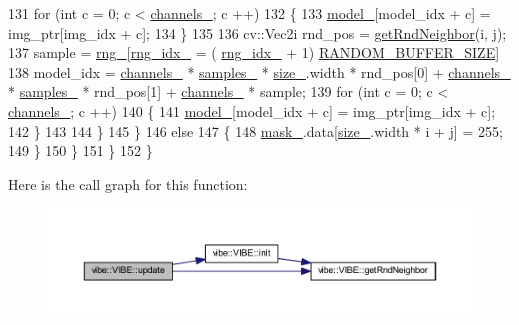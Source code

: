\begin{DoxyCode}
131                     \textcolor{keywordflow}{for} (\textcolor{keywordtype}{int} c = 0; c < \mbox{\hyperlink{classvibe_1_1_v_i_b_e_a141be141bc39ddd6b9dd04df62b5e3b9}{channels\_}}; c ++)
132                     \{
133                         \mbox{\hyperlink{classvibe_1_1_v_i_b_e_af42cd53bbc91e95f14aa6c474bde5601}{model\_}}[model\_idx + c] = img\_ptr[img\_idx + c];
134                     \}
135 
136                     cv::Vec2i rnd\_pos = \mbox{\hyperlink{classvibe_1_1_v_i_b_e_a5ca071697edce3a8459f93cba2386516}{getRndNeighbor}}(i, j);
137                     sample = \mbox{\hyperlink{classvibe_1_1_v_i_b_e_abc43782cfa12e3f055fa1212833f8595}{rng\_}}[\mbox{\hyperlink{classvibe_1_1_v_i_b_e_a76075aca9f68dffb84163e510b2dd122}{rng\_idx\_}} = ( \mbox{\hyperlink{classvibe_1_1_v_i_b_e_a76075aca9f68dffb84163e510b2dd122}{rng\_idx\_}} + 1) %
      \mbox{\hyperlink{vibe_8hpp_a776fe25c29d34b95d69a1418f75ae80f}{RANDOM\_BUFFER\_SIZE}}] %
138                     model\_idx = \mbox{\hyperlink{classvibe_1_1_v_i_b_e_a141be141bc39ddd6b9dd04df62b5e3b9}{channels\_}} * \mbox{\hyperlink{classvibe_1_1_v_i_b_e_ab27dfab66880b3b9fe8ceeafde283f4c}{samples\_}} * \mbox{\hyperlink{classvibe_1_1_v_i_b_e_a4748d53eff7e5a96ad4f98206dc7bb2c}{size\_}}.width * rnd\_pos[0] + 
      \mbox{\hyperlink{classvibe_1_1_v_i_b_e_a141be141bc39ddd6b9dd04df62b5e3b9}{channels\_}} * \mbox{\hyperlink{classvibe_1_1_v_i_b_e_ab27dfab66880b3b9fe8ceeafde283f4c}{samples\_}} * rnd\_pos[1] + \mbox{\hyperlink{classvibe_1_1_v_i_b_e_a141be141bc39ddd6b9dd04df62b5e3b9}{channels\_}} * sample;
139                     \textcolor{keywordflow}{for} (\textcolor{keywordtype}{int} c = 0; c < \mbox{\hyperlink{classvibe_1_1_v_i_b_e_a141be141bc39ddd6b9dd04df62b5e3b9}{channels\_}}; c ++)
140                     \{
141                         \mbox{\hyperlink{classvibe_1_1_v_i_b_e_af42cd53bbc91e95f14aa6c474bde5601}{model\_}}[model\_idx + c] = img\_ptr[img\_idx + c];
142                     \}
143 
144                 \}
145             \}
146             \textcolor{keywordflow}{else}
147             \{
148                 \mbox{\hyperlink{classvibe_1_1_v_i_b_e_a7840cacb0f0c76e6280a8a4fad32e136}{mask\_}}.data[\mbox{\hyperlink{classvibe_1_1_v_i_b_e_a4748d53eff7e5a96ad4f98206dc7bb2c}{size\_}}.width * i + j] = 255;
149             \}
150         \}
151     \}
152 \}
\end{DoxyCode}
Here is the call graph for this function\+:\nopagebreak
\begin{figure}[H]
\begin{center}
\leavevmode
\includegraphics[width=350pt]{classvibe_1_1_v_i_b_e_a9730e3695fa085ae907767390b3ad3de_cgraph}
\end{center}
\end{figure}


